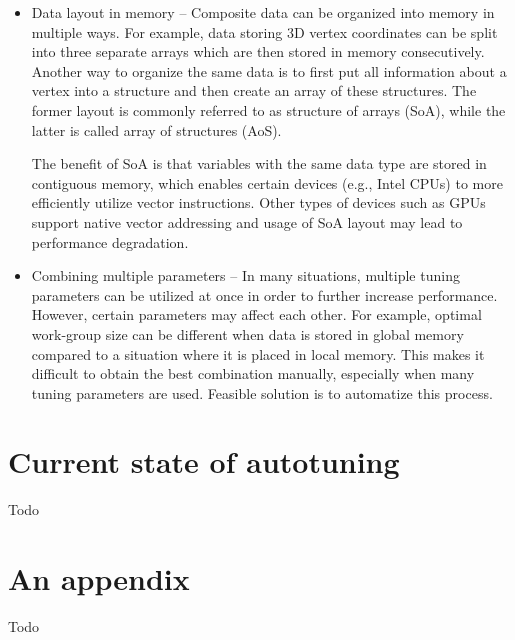 \documentclass[
  digital,     %
  oneside,     %
  nosansbold,  %
  nocolorbold, %
  lof,         %
  lot,         %
  nocover
]{fithesis4}
\begin{document}
\begin{itemize}
	\item Data layout in memory -- Composite data can be organized into memory in multiple ways. For example, data storing 3D vertex coordinates can be split into three separate arrays which are then stored in memory consecutively. Another way to organize the same data is to first put all information about a vertex into a structure and then create an array of these structures. The former layout is commonly referred to as structure of arrays (SoA), while the latter is called array of structures (AoS).
	
	The benefit of SoA is that variables with the same data type are stored in contiguous memory, which enables certain devices (e.g., Intel CPUs) to more efficiently utilize vector instructions. Other types of devices such as GPUs support native vector addressing and usage of SoA layout may lead to performance degradation.
	\item Combining multiple parameters -- In many situations, multiple tuning parameters can be utilized at once in order to further increase performance. However, certain parameters may affect
	each other. For example, optimal work-group size can be different when data is stored in global memory compared to a situation where it is placed in local memory. This makes it difficult to obtain the best combination manually, especially when many tuning parameters are used. Feasible solution is to automatize this process.
\end{itemize}

\chapter{Current state of autotuning}
Todo

\printbibliography[heading=bibintoc]

\appendix
\chapter{An appendix}
Todo
\end{document}
